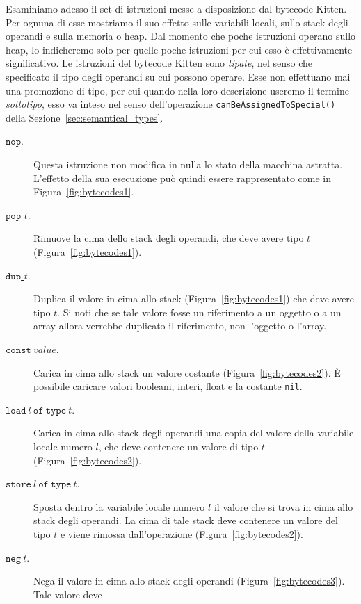 Esaminiamo adesso il set di istruzioni messe a disposizione dal bytecode
Kitten. Per ognuna di esse mostriamo il suo effetto sulle variabili locali,
sullo stack degli operandi e sulla memoria o heap. Dal momento che
poche istruzioni operano sullo heap, lo indicheremo solo per quelle poche
istruzioni per cui esso \`e effettivamente significativo.
Le istruzioni del bytecode Kitten
sono \emph{tipate}, nel senso che \e specificato il tipo
degli operandi su cui possono operare. Esse non effettuano mai una promozione
di tipo, per cui quando nella loro descrizione useremo il termine
\emph{sottotipo}, esso va inteso nel senso dell'operazione
\texttt{canBeAssignedToSpecial()} della Sezione~\ref{sec:semantical_types}.
%
\begin{description}
\item[\underline{$\mathtt{nop}$}.] Questa istruzione non modifica in nulla
  lo stato della macchina astratta. L'effetto della sua esecuzione pu\`o
  quindi essere rappresentato come in Figura~\ref{fig:bytecodes1}.
\item[\underline{$\mathtt{pop}$ $t$}.]
  Rimuove la cima dello stack degli operandi, che deve avere tipo $t$
  (Figura~\ref{fig:bytecodes1}).
\item[\underline{$\mathtt{dup}$ $t$}.] Duplica il valore in cima allo stack
  (Figura~\ref{fig:bytecodes1}) che deve avere tipo $t$.
  Si noti che se tale valore fosse un
  riferimento a un oggetto o a un array allora verrebbe duplicato il
  riferimento, non l'oggetto o l'array.
\item[\underline{$\mathtt{const}\ \mathit{value}$}.]
  Carica in cima allo stack un valore
  costante (Figura~\ref{fig:bytecodes2}).
  \`E possibile caricare valori booleani, interi, float e la
  costante \texttt{nil}.
\item[\underline{$\mathtt{load\ \mathit{l}\ of\ type\ \mathit{t}}$}.]
  Carica in cima allo stack degli operandi
  una copia del valore della variabile locale
  numero $l$, che deve contenere un valore di tipo $t$
  (Figura~\ref{fig:bytecodes2}).
\item[\underline{$\mathtt{store\ \mathit{l}\ of\ type\ \mathit{t}}$}.]
  Sposta dentro la variabile locale numero $l$ il valore che si trova
  in cima allo stack degli operandi. La cima di tale stack deve contenere un
  valore del tipo $t$ e viene rimossa dall'operazione
  (Figura~\ref{fig:bytecodes2}).
\item[\underline{$\mathtt{neg\ \mathit{t}}$}.]
  Nega il valore in cima allo stack degli operandi
  (Figura~\ref{fig:bytecodes3}). Tale valore deve

\end{description}
